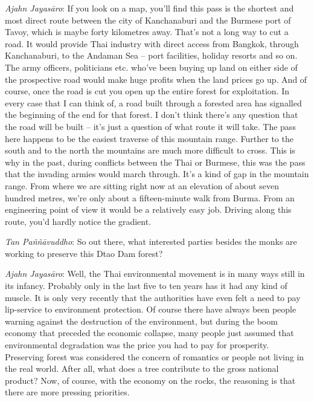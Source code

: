 \emph{Ajahn Jayasāro}: If you look on a map, you'll find this pass is
the shortest and most direct route between the city of Kanchanaburi and
the Burmese port of Tavoy, which is maybe forty kilometres away. That's
not a long way to cut a road. It would provide Thai industry with direct
access from Bangkok, through Kanchanaburi, to the Andaman Sea -- port
facilities, holiday resorts and so on. The army officers, politicians
etc. who've been buying up land on either side of the prospective road
would make huge profits when the land prices go up. And of course, once
the road is cut you open up the entire forest for exploitation. In every
case that I can think of, a road built through a forested area has
signalled the beginning of the end for that forest. I don't think
there's any question that the road will be built -- it's just a
question of what route it will take. The pass here happens to be the
easiest traverse of this mountain range. Further to the south and to the
north the mountains are much more difficult to cross. This is why in the
past, during conflicts between the Thai or Burmese, this was the pass
that the invading armies would march through. It's a kind of gap in the
mountain range. From where we are sitting right now at an elevation of
about seven hundred metres, we're only about a fifteen-minute walk from
Burma. From an engineering point of view it would be a relatively easy
job. Driving along this route, you'd hardly notice the gradient. 

\emph{Tan Paññāvuddho}: So out there, what interested parties besides
the monks are working to preserve this Dtao Dam forest? 

\emph{Ajahn Jayasāro}: Well, the Thai environmental movement is in many
ways still in its infancy. Probably only in the last five to ten years
has it had any kind of muscle. It is only very recently that the
authorities have even felt a need to pay lip-service to environment
protection. Of course there have always been people warning against the
destruction of the environment, but during the boom economy that
preceded the economic collapse, many people just assumed that
environmental degradation was the price you had to pay for prosperity. 
Preserving forest was considered the concern of romantics or people not
living in the real world. After all, what does a tree contribute to the
gross national product? Now, of course, with the economy on the rocks, 
the reasoning is that there are more pressing priorities. 

